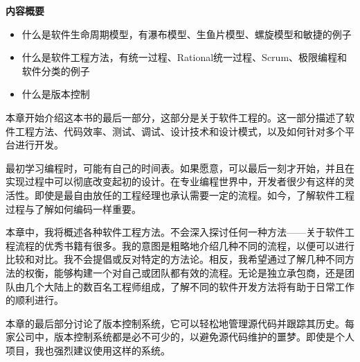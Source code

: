 \noindent
\textbf{内容概要}

\begin{itemize}
\item
什么是软件生命周期模型，有瀑布模型、生鱼片模型、螺旋模型和敏捷的例子

\item
什么是软件工程方法，有统一过程、Rational统一过程、Scrum、极限编程和软件分类的例子

\item
什么是版本控制
\end{itemize}

本章开始介绍这本书的最后一部分，这部分是关于软件工程的。这一部分描述了软件工程方法、代码效率、测试、调试、设计技术和设计模式，以及如何针对多个平台进行开发。

最初学习编程时，可能有自己的时间表。如果愿意，可以最后一刻才开始，并且在实现过程中可以彻底改变起初的设计。在专业编程世界中，开发者很少有这样的灵活性。即使是最自由放任的工程经理也承认需要一定的流程。如今，了解软件工程过程与了解如何编码一样重要。

本章中，我将概述各种软件工程方法。不会深入探讨任何一种方法——关于软件工程流程的优秀书籍有很多。我的意图是粗略地介绍几种不同的流程，以便可以进行比较和对比。我不会提倡或反对特定的方法论。相反，我希望通过了解几种不同方法的权衡，能够构建一个对自己或团队都有效的流程。无论是独立承包商，还是团队由几个大陆上的数百名工程师组成，了解不同的软件开发方法将有助于日常工作的顺利进行。

本章的最后部分讨论了版本控制系统，它可以轻松地管理源代码并跟踪其历史。每家公司中，版本控制系统都是必不可少的，以避免源代码维护的噩梦。即使是个人项目，我也强烈建议使用这样的系统。








